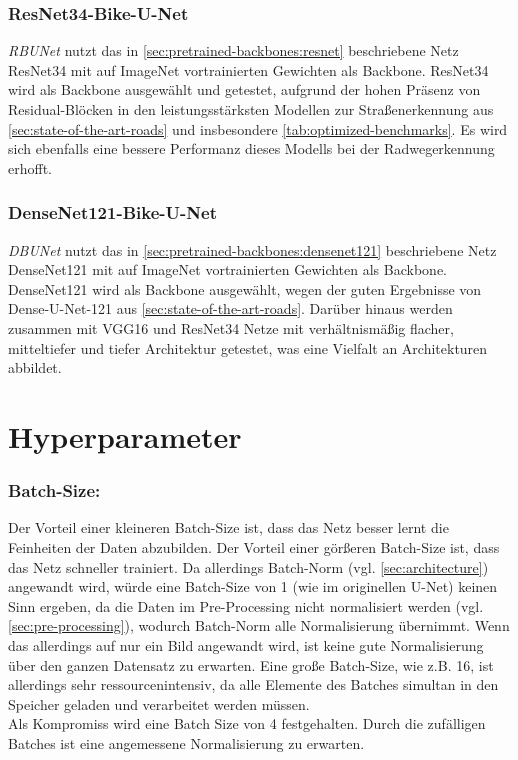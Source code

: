 \subsubsection{ResNet34-Bike-U-Net}

\textit{\ac{RBUNet}} nutzt das in \autoref{sec:pretrained-backbones:resnet} beschriebene Netz ResNet34 
mit auf ImageNet vortrainierten Gewichten als Backbone. 
ResNet34 wird als Backbone ausgewählt und getestet, aufgrund der hohen Präsenz von 
Residual-Blöcken in den leistungsstärksten Modellen 
zur Straßenerkennung aus \autoref{sec:state-of-the-art-roads} und insbesondere \autoref{tab:optimized-benchmarks}.
Es wird sich ebenfalls eine bessere Performanz dieses Modells bei der Radwegerkennung erhofft. 

\subsubsection{DenseNet121-Bike-U-Net}

\textit{\ac{DBUNet}} nutzt das in \autoref{sec:pretrained-backbones:densenet121} beschriebene Netz DenseNet121 
mit auf ImageNet vortrainierten Gewichten als Backbone.
DenseNet121 wird als Backbone ausgewählt, wegen der guten Ergebnisse von Dense-U-Net-121 aus \autoref{sec:state-of-the-art-roads}. 
Darüber hinaus werden zusammen mit VGG16 und ResNet34 Netze mit verhältnismäßig flacher, mitteltiefer und tiefer 
Architektur getestet, was eine Vielfalt an Architekturen abbildet.

\section{Hyperparameter} \label{sec:hyperparameter}

\subsubsection{Batch-Size:}

Der Vorteil einer kleineren Batch-Size ist, dass das Netz besser lernt die Feinheiten der Daten abzubilden. 
Der Vorteil einer görßeren Batch-Size ist, dass das Netz schneller trainiert. 
Da allerdings Batch-Norm (vgl. \autoref{sec:architecture}) angewandt wird, würde eine Batch-Size von 1 (wie im originellen U-Net) keinen 
Sinn ergeben, da die Daten im Pre-Processing nicht normalisiert werden (vgl. \autoref{sec:pre-processing}), wodurch Batch-Norm alle 
Normalisierung übernimmt. Wenn das allerdings auf nur ein Bild angewandt wird, ist keine gute Normalisierung über den ganzen Datensatz zu erwarten. 
Eine große Batch-Size, wie z.B. 16, ist allerdings sehr ressourcenintensiv, da alle Elemente des Batches simultan in den Speicher geladen und verarbeitet 
werden müssen. \\
Als Kompromiss wird eine Batch Size von 4 festgehalten. Durch die zufälligen Batches ist eine angemessene Normalisierung zu erwarten.

